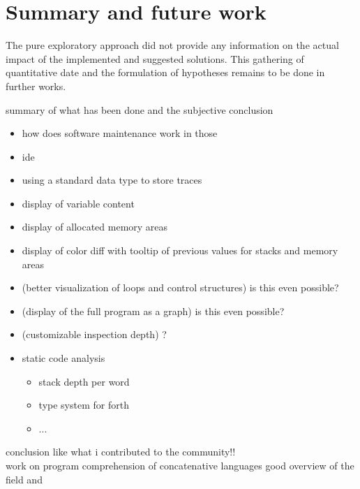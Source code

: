 \chapter{Summary and future work}

The pure exploratory approach did not provide any information on the actual impact of the implemented and suggested solutions. This gathering of quantitative date and the formulation of hypotheses remains to be done in further works.

summary of what has been done and the subjective conclusion

\begin{itemize}
\item how does software maintenance work in those
\item ide
\item using a standard data type to store traces
\item display of variable content
\item display of allocated memory areas
\item display of color diff with tooltip of previous values for stacks and memory areas
\item (better visualization of loops and control structures) is this even possible?
\item (display of the full program as a graph) is this even possible?
\item (customizable inspection depth) ?
\item static code analysis
\begin{itemize}
\item stack depth per word
\item type system for forth
\item ...
\end{itemize}
\end{itemize}


conclusion like what i contributed to the community!!\\

work on program comprehension of concatenative languages
good overview of the field \cite{Canfora:2011:ACS:1924421.1924451} and \cite{Cornelissen2009}